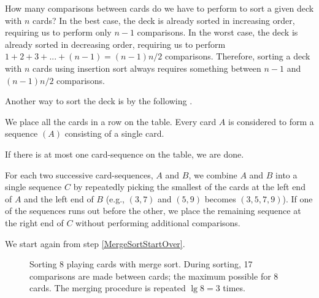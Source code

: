 \documentclass[b5paper, english, oneside]{memoir}
\begin{document}
How many comparisons between cards do we have to perform to sort a given deck with $n$ cards? In the best case, the deck is already sorted in increasing order, requiring us to perform only $n - 1$ comparisons. In the worst case, the deck is already sorted in decreasing order, requiring us to perform $1 + 2 + 3 + ... + (n - 1) = (n - 1) n / 2$ comparisons. Therefore, sorting a deck with $n$ cards using insertion sort always requires something between $n - 1$ and $(n - 1)n / 2$ comparisons.

Another way to sort the deck is by the following .

\begin{enumbox}
\item We place all the cards in a row on the table. Every card $A$ is considered to form a sequence $(A)$ consisting of a single card.
\item \label{MergeSortStartOver} If there is at most one card-sequence on the table, we are done.
\item For each two successive card-sequences, $A$ and $B$, we combine $A$ and $B$ into a single sequence $C$ by repeatedly picking the smallest of the cards at the left end of $A$ and the left end of $B$ (e.g., $(3, 7)$ and $(5, 9)$ becomes $(3, 5, 7, 9)$). If one of the sequences runs out before the other, we place the remaining sequence at the right end of $C$ without performing additional comparisons.
\item We start again from step \ref{MergeSortStartOver}.
\end{enumbox}

\begin{figure}
\centering
\hfill{}\hfill\null

\hfill{}\hfill\null

\hfill{}\hfill\null

\hfill{}\hfill\null
\caption{Sorting 8 playing cards with merge sort. During sorting, 17 comparisons are made between cards; the maximum possible for 8 cards. The merging procedure is repeated $\lg{8} = 3$ times.}
\label{MergeSortExample}
\end{figure}
\end{document}
